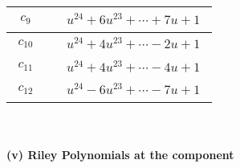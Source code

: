 \documentclass[1p]{elsarticle_modified}
\theoremstyle{definition}
\begin{document}
\begin{tabular}{m{50pt}|m{274pt}}
\hline $$\begin{aligned}c_{9}\end{aligned}$$&$\begin{aligned}
&u^{24}+6 u^{23}+\cdots+7 u+1
\end{aligned}$\\
\hline $$\begin{aligned}c_{10}\end{aligned}$$&$\begin{aligned}
&u^{24}+4 u^{23}+\cdots-2 u+1
\end{aligned}$\\
\hline $$\begin{aligned}c_{11}\end{aligned}$$&$\begin{aligned}
&u^{24}+4 u^{23}+\cdots-4 u+1
\end{aligned}$\\
\hline $$\begin{aligned}c_{12}\end{aligned}$$&$\begin{aligned}
&u^{24}-6 u^{23}+\cdots-7 u+1
\end{aligned}$\\
\hline
\end{tabular}\\~\\
\newpage\renewcommand{\arraystretch}{1}
\flushleft \textbf{(v) Riley Polynomials at the component}\newline \\
\end{document}
